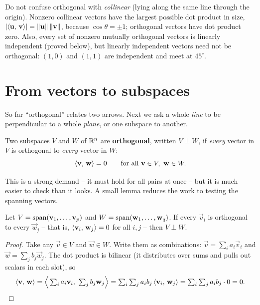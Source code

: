 \begin{trapbox}
Do not confuse orthogonal with \emph{collinear} (lying along the same line through the
origin). Nonzero collinear vectors have the largest possible dot product in size,
$\lvert\langle \mathbf{u},\, \mathbf{v} \rangle\rvert=\lVert\mathbf{u}\rVert\,\lVert\mathbf{v}\rVert$, because $\cos\theta=\pm1$;
orthogonal vectors have dot product zero. Also, every set of nonzero mutually orthogonal
vectors is linearly independent (proved below), but linearly independent vectors
need not be orthogonal: $(1,0)$ and $(1,1)$ are independent and meet at $45^\circ$.
\end{trapbox}

\section{From vectors to subspaces}

So far ``orthogonal'' relates two arrows. Next we ask a whole \emph{line} to be
perpendicular to a whole \emph{plane}, or one subspace to another.

\begin{definition}\label{ch17:def-orthogonal-subspaces}
Two subspaces $V$ and $W$ of $\mathbb{R}^n$ are \textbf{orthogonal}, written $V\perp W$, if
\emph{every} vector in $V$ is orthogonal to \emph{every} vector in $W$:
\[
  \langle \mathbf{v},\, \mathbf{w} \rangle = 0 \qquad \text{for all } \mathbf{v}\in V,\ \mathbf{w}\in W.
\]
\end{definition}

This is a strong demand -- it must hold for all pairs at once -- but it is much easier to check
than it looks. A small lemma reduces the work to testing the spanning vectors.

\begin{lemma}\label{ch17:basis-suffices}
Let $V=\operatorname{span}(\mathbf{v}_1,\dots,\mathbf{v}_p)$ and $W=\operatorname{span}(\mathbf{w}_1,\dots,\mathbf{w}_q)$. If every
$\vec{v}_i$ is orthogonal to every $\vec{w}_j$ -- that is, $\langle \mathbf{v}_i,\, \mathbf{w}_j \rangle=0$
for all $i,j$ -- then $V\perp W$.
\end{lemma}

\begin{proof}
Take any $\vec{v}\in V$ and $\vec{w}\in W$. Write them as combinations: $\vec{v}=\sum_i a_i\vec{v}_i$
and $\vec{w}=\sum_j b_j\vec{w}_j$. The dot product is bilinear (it distributes over sums and pulls
out scalars in each slot), so
\[
  \langle \mathbf{v},\, \mathbf{w} \rangle
  = \Big\langle \textstyle\sum_i a_i\mathbf{v}_i,\ \sum_j b_j\mathbf{w}_j\Big\rangle
  = \sum_i\sum_j a_i b_j \,\langle \mathbf{v}_i,\, \mathbf{w}_j \rangle
  = \sum_i\sum_j a_i b_j \cdot 0 = 0. \qedhere
\]
\end{proof}

